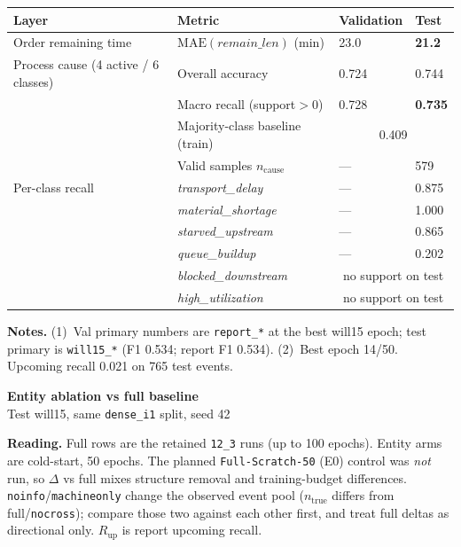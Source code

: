 \documentclass[10pt,a4paper]{article}
\begin{document}
\begin{center}
\begin{tabular}{l l l l}
\toprule
Layer & Metric & Validation & Test \\
\midrule
Order remaining time
  & $\mathrm{MAE}(\textit{remain\_len})$ (min)
  & 23.0
  & \textbf{21.2} \\
\midrule
Process cause (4 active / 6 classes)
  & Overall accuracy
  & 0.724
  & 0.744 \\
  & Macro recall (support${>}0$)
  & 0.728
  & \textbf{0.735} \\
  & Majority-class baseline (train)
  & \multicolumn{2}{c}{0.409} \\
  & Valid samples $n_{\mathrm{cause}}$
  & ---
  & 579 \\
\midrule
Per-class recall
  & \textit{transport\_delay}
  & --- & 0.875 \\
  & \textit{material\_shortage}
  & --- & 1.000 \\
  & \textit{starved\_upstream}
  & --- & 0.865 \\
  & \textit{queue\_buildup}
  & --- & 0.202 \\
  & \textit{blocked\_downstream}
  & \multicolumn{2}{c}{no support on test} \\
  & \textit{high\_utilization}
  & \multicolumn{2}{c}{no support on test} \\
\bottomrule
\end{tabular}
\end{center}

\small
\textbf{Notes.}
(1)~Val primary numbers are \texttt{report\_*} at the best will15 epoch; test primary is \texttt{will15\_*} (F1 0.534; report F1 0.534).
(2)~Best epoch 14/50. Upcoming recall 0.021 on 765 test events.

\clearpage
\begin{center}
{\LARGE\bfseries Entity ablation vs full baseline}\\[3pt]
{\large Test will15, same \texttt{dense\_i1} split, seed 42}
\end{center}

\textbf{Reading.}
Full rows are the retained \texttt{12\_3} runs (up to 100 epochs). Entity arms are cold-start, 50 epochs.
The planned \texttt{Full-Scratch-50} (E0) control was \emph{not} run, so $\Delta$ vs full mixes structure removal and training-budget differences.
\texttt{noinfo}/\texttt{machineonly} change the observed event pool ($n_{\mathrm{true}}$ differs from full/\texttt{nocross}); compare those two against each other first, and treat full deltas as directional only.
$R_{\mathrm{up}}$ is report upcoming recall.
\end{document}
